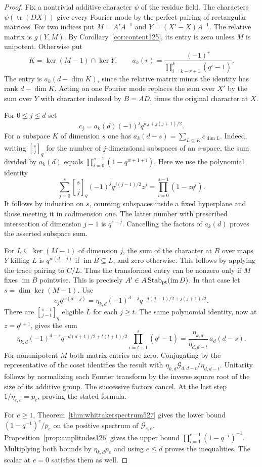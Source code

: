 \documentclass[a4paper,11pt]{article}
\theoremstyle{definition}
\theoremstyle{remark}
\numberwithin{equation}{section}
\begin{document}
\begin{proof}
Fix a nontrivial additive character \(\psi\) of the residue field.
The characters \(\psi(\operatorname{tr}(DX))\) give every Fourier mode
by the perfect pairing of rectangular matrices. For two indices put
\(M=A'A^{-1}\) and \(Y=(X'-X)A^{-1}\). The relative matrix is
\(g(Y,M)\). By Corollary~\ref{cor:content125}, its entry is zero
unless \(M\) is unipotent. Otherwise put
\[
    K=\ker(M-1)\cap\ker Y,\qquad
    a_k(r)=\frac{(-1)^r}{\prod_{i=k-r+1}^k(q^i-1)}.
\]
The entry is \(a_k(d-\dim K)\), since the relative matrix minus the
identity has rank \(d-\dim K\). Acting on one Fourier mode replaces
the sum over \(X'\) by the sum over \(Y\) with character indexed by
\(B=AD\), times the original character at \(X\).

For \(0\le j\le d\) set
\[
 c_j=a_k(d)(-1)^j q^{wj+j(j+1)/2}.
\]
For a subspace \(K\) of dimension \(s\) one has
\(a_k(d-s)=\sum_{L\subseteq K}c_{\dim L}\).
Indeed, writing \({s\brack j}_q\) for the number of \(j\)-dimensional
subspaces of an \(s\)-space, the sum divided by \(a_k(d)\) equals
\(\prod_{i=0}^{s-1}(1-q^{w+1+i})\).
Here we use the polynomial identity
\[
 \sum_{j=0}^{s}{s\brack j}_q(-1)^j q^{j(j-1)/2}z^j
     =\prod_{i=0}^{s-1}(1-zq^i).
\]
It follows by induction on \(s\), counting subspaces inside a fixed
hyperplane and those meeting it in codimension one. The latter number
with prescribed intersection of dimension \(j-1\) is \(q^{s-j}\).
Cancelling the factors of \(a_k(d)\) proves the asserted subspace sum.

For \(L\subseteq\ker(M-1)\) of dimension \(j\), the sum of the
character at \(B\) over maps \(Y\) killing \(L\) is \(q^{w(d-j)}\)
if \(\operatorname{im}B\subseteq L\), and zero otherwise. This follows
by applying the trace pairing to \(C/L\). Thus the transformed entry
can be nonzero only if \(M\) fixes \(\operatorname{im}B\) pointwise.
This is precisely \(A'\in A\operatorname{Stab}_{\rm pt}
(\operatorname{im}D)\). In that case let \(s=\dim\ker(M-1)\). Use
\[
 c_j q^{w(d-j)}
   =\eta_{k,d}(-1)^{d-j}q^{-d(d+1)/2+j(j+1)/2}.
\]
There are \({s-t\brack j-t}_q\) eligible \(L\) for each \(j\ge t\).
The same polynomial identity, now at \(z=q^{t+1}\), gives the sum
\[
 \eta_{k,d}(-1)^{d-s}q^{-d(d+1)/2+t(t+1)/2}
       \prod_{i=t+1}^{s}(q^i-1)
      =\frac{\eta_{k,d}}{\eta_{d,d-t}}\,a_d(d-s).
\]
For nonunipotent \(M\) both matrix entries are zero. Conjugating by
the representative of the coset identifies the result with
\(\eta_{k,d}\mathcal G_{d,d-t}/\eta_{d,d-t}\). Unitarity follows by
normalizing each Fourier transform by the inverse square root of the
size of its additive group. The successive factors cancel. At the
last step \(1/\eta_{e,e}=p_e\), proving the stated formula.

For \(e\ge1\), Theorem~\ref{thm:whittakerspectrum527} gives the
lower bound \((1-q^{-1})^e/p_e\) on the positive spectrum of
\(\mathcal G_{e,e}\). Proposition~\ref{prop:amplitudes126} gives the
upper bound \(\prod_{i=1}^{e-1}(1-q^{-i})^{-1}\).
Multiplying both bounds by \(\eta_{k,d}p_e\) and using \(e\le d\)
proves the inequalities. The scalar at \(e=0\) satisfies them as well.
\end{proof}
\end{document}
